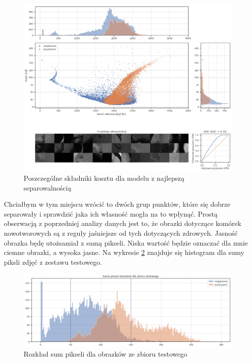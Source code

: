 \begin{figure}[h!]
    \centering
    \includegraphics[width=1.0\textwidth]{images/soft_vae_v2}
    \caption{Poszczególne składniki kosztu dla modelu z najlepszą separowalnością}
    \label{fig:soft_vae}
\end{figure}

Chciałbym w tym miejscu wrócić to dwóch grup punktów, które się dobrze separowały i sprawdzić jaka ich własność mogła na to wpłynąć. Prostą obserwacją z poprzedniej analizy danych jest to, że obrazki dotyczące komórek nowotworowych są z reguły jaśniejsze od tych dotyczących zdrowych. Jasność obrazka będę utożsamiał z sumą pikseli. Niska wartość będzie oznaczać dla mnie ciemne obrazki, a wysoka jasne. Na wykresie \ref{fig:pixels_hist} znajduje się histogram dla sumy piksli zdjęć z zestawu testowego.

\begin{figure}[h!]
    \centering
    \includegraphics[width=1.0\textwidth]{images/pixels_hist_v2}
    \caption{Rozkład sum pikseli dla obrazków ze zbioru testowego}
    \label{fig:pixels_hist}
\end{figure}

